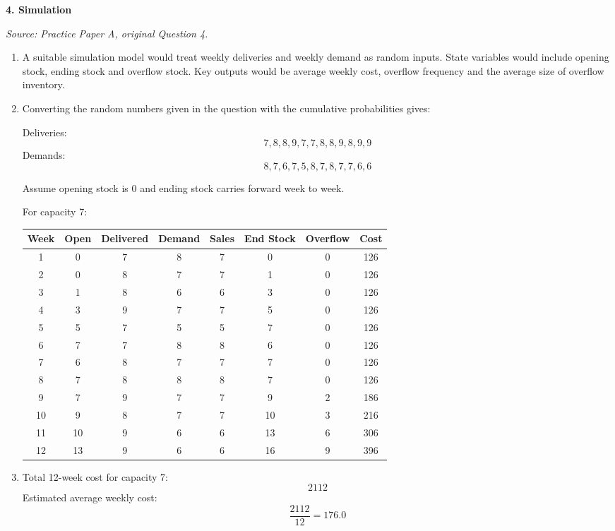 \documentclass[11pt,a4paper]{article}
\begin{document}
\newpage

\textbf{4. Simulation}

\textit{Source: Practice Paper A, original Question 4.}



\begin{enumerate}
\item A suitable simulation model would treat weekly deliveries and weekly demand as random inputs. State variables would include opening stock, ending stock and overflow stock. Key outputs would be average weekly cost, overflow frequency and the average size of overflow inventory.

\item Converting the random numbers given in the question with the cumulative probabilities gives:

Deliveries:
\[
7,8,8,9,7,7,8,8,9,8,9,9
\]
Demands:
\[
8,7,6,7,5,8,7,8,7,7,6,6
\]

Assume opening stock is 0 and ending stock carries forward week to week.

For capacity 7:

\begin{center}
\begin{tabular}{cccccccc}
\toprule
Week & Open & Delivered & Demand & Sales & End Stock & Overflow & Cost \\
\midrule
1 & 0 & 7 & 8 & 7 & 0 & 0 & 126 \\
2 & 0 & 8 & 7 & 7 & 1 & 0 & 126 \\
3 & 1 & 8 & 6 & 6 & 3 & 0 & 126 \\
4 & 3 & 9 & 7 & 7 & 5 & 0 & 126 \\
5 & 5 & 7 & 5 & 5 & 7 & 0 & 126 \\
6 & 7 & 7 & 8 & 8 & 6 & 0 & 126 \\
7 & 6 & 8 & 7 & 7 & 7 & 0 & 126 \\
8 & 7 & 8 & 8 & 8 & 7 & 0 & 126 \\
9 & 7 & 9 & 7 & 7 & 9 & 2 & 186 \\
10 & 9 & 8 & 7 & 7 & 10 & 3 & 216 \\
11 & 10 & 9 & 6 & 6 & 13 & 6 & 306 \\
12 & 13 & 9 & 6 & 6 & 16 & 9 & 396 \\
\bottomrule
\end{tabular}
\end{center}

\item Total 12-week cost for capacity 7:
\[
2112
\]
Estimated average weekly cost:
\[
\frac{2112}{12}=176.0
\]


\end{enumerate}
\end{document}
